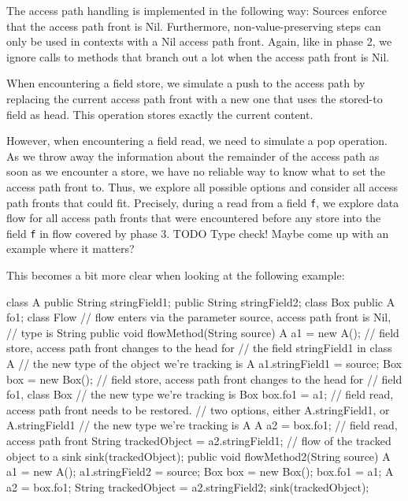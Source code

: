 The access path handling is implemented in the following way:
Sources enforce that the access path front is Nil.
Furthermore, non-value-preserving steps can only be used in contexts with
a Nil access path front.
Again, like in phase 2, we ignore calls to methods that branch out a lot when the
access path front is Nil.

When encountering a field store, we simulate a push to the access path by replacing 
the current access path front with a new one that uses the stored-to field 
as head.
This operation stores exactly the current content.

However, when encountering a field read, we need to simulate a pop operation.
As we throw away the information about the remainder of the access path as soon as 
we encounter a store, we have no reliable way to know what to set the access path front 
to.
Thus, we explore all possible options and consider all access path fronts that could fit.
Precisely, during a read from a field \texttt{f},
we explore data flow for all access path fronts that were encountered before 
any store into the field \texttt{f} in flow covered by phase 3.
TODO Type check! Maybe come up with an example where it matters?

This becomes a bit more clear when looking at the following example:

\begin{listing}[H]
    \begin{javacode}
        class A {
            public String stringField1;
            public String stringField2;
        }
        class Box {
            public A fo1;
        }
        class Flow {
            // flow enters via the parameter source, access path front is Nil, 
            // type is String
            public void flowMethod(String source) {
                A a1 = new A();
                // field store, access path front changes to the head for 
                // the field stringField1 in class A
                // the new type of the object we're tracking is A
                a1.stringField1 = source;
                Box box = new Box();
                // field store, access path front changes to the head for
                // field fo1, class Box
                // the new type we're tracking is Box
                box.fo1 = a1;
                // field read, access path front needs to be restored.
                // two options, either A.stringField1, or A.stringField1
                // the new type we're tracking is A
                A a2 = box.fo1;
                // field read, access path front 
                String trackedObject = a2.stringField1;
                // flow of the tracked object to a sink
                sink(trackedObject);
            }         
            public void flowMethod2(String source) {
                A a1 = new A();
                a1.stringField2 = source;
                Box box = new Box();
                box.fo1 = a1;
                A a2 = box.fo1;
                String trackedObject = a2.stringField2;
                sink(trackedObject);
            }
        }
    \end{javacode}
\end{listing}

